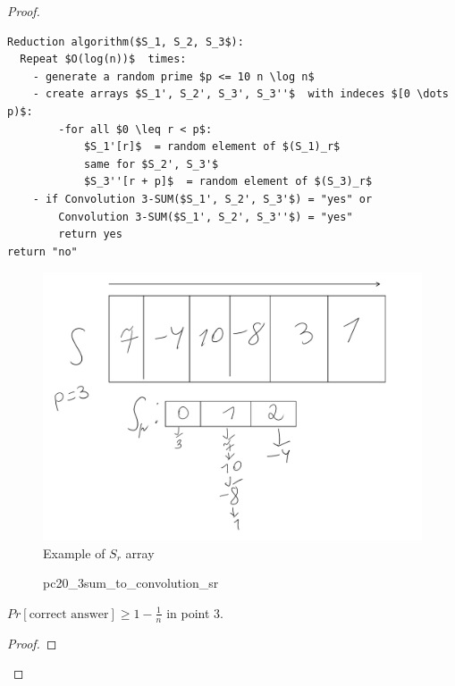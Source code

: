 \begin{proof}
\begin{enumerate}
	  \begin{lstlisting}
Reduction algorithm($S_1, S_2, S_3$):
  Repeat $O(log(n))$  times:
	- generate a random prime $p <= 10 n \log n$
	- create arrays $S_1', S_2', S_3', S_3''$  with indeces $[0 \dots p)$:
		-for all $0 \leq r < p$:
			$S_1'[r]$  = random element of $(S_1)_r$
			same for $S_2', S_3'$
			$S_3''[r + p]$  = random element of $(S_3)_r$
	- if Convolution 3-SUM($S_1', S_2', S_3'$) = "yes" or
		Convolution 3-SUM($S_1', S_2', S_3''$) = "yes"
		return yes
return "no"
	  \end{lstlisting}

  \end{enumerate}

  \begin{figure}[ht]
	\center
	\includegraphics[scale=0.3]{figures/2.pdf}
	\caption{Example of $S_r$ array}
  \end{figure}

\begin{figure}[ht]
    \centering
    \caption{pc20_3sum_to_convolution_sr}
    \label{fig:pc20_3sum_to_convolution_sr}
\end{figure}

  \begin{thm}
	$Pr[\text{correct answer}] \geq 1 - \frac{1}{n}$ in point 3.
  \end{thm}
  \begin{proof}


\end{proof}
\end{proof}

